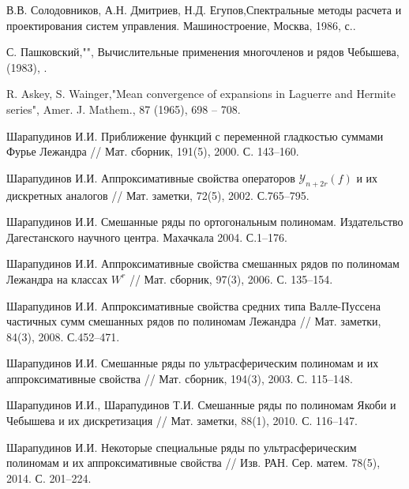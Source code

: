 \begin{thebibliography}{99}
В.В. Солодовников, А.Н. Дмитриев, Н.Д. Егупов,Спектральные методы расчета и проектирования систем управления. Машиностроение, Москва, 1986,  с..


С. Пашковский,"", Вычислительные применения многочленов и рядов Чебышева,  (1983), .


R. Askey, S. Wainger,"Mean convergence of expansions in Laguerre and Hermite series", Amer. J. Mathem., 87 (1965), 698 -- 708.


{Шарапудинов И.И.} Приближение функций с переменной гладкостью суммами Фурье Лежандра // Мат. сборник,
191(5), 2000. С. 143--160.



{Шарапудинов И.И.} Аппроксимативные свойства операторов $\mathcal{ Y}_{n+2r}(f)$ и их дискретных аналогов // Мат. заметки, 72(5), 2002. С.765--795.



{Шарапудинов И.И.} Смешанные ряды по ортогональным полиномам. Издательство Дагестанского научного центра.
Махачкала 2004. С.1--176.



{Шарапудинов И.И.}
Аппроксимативные свойства смешанных рядов по полиномам Лежандра на классах $W^r$ //
Мат. сборник, 97(3), 2006. С. 135--154.



{Шарапудинов И.И.}
Аппроксимативные свойства средних типа Валле-Пуссена частичных сумм смешанных рядов по полиномам Лежандра // Мат. заметки, 84(3), 2008. С.452--471.



{Шарапудинов И.И.}
Смешанные ряды по ультрасферическим полиномам и их аппроксимативные свойства
// Мат. сборник, 194(3), 2003. С. 115--148.



{Шарапудинов И.И., Шарапудинов Т.И.}
Смешанные ряды по полиномам Якоби и Чебышева и их дискретизация
// Мат. заметки, 88(1), 2010. С. 116--147.



{Шарапудинов И.И.}
Некоторые специальные ряды по ультрасферическим полиномам и их аппроксимативные свойства
// Изв. РАН. Сер. матем. 78(5), 2014. С. 201--224.




\end{thebibliography}
